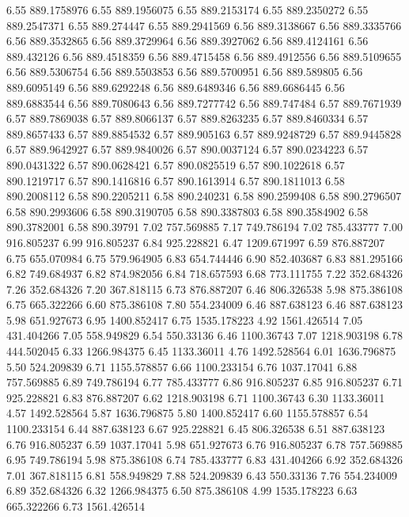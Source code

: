 6.55 	889.1758976
6.55 	889.1956075
6.55 	889.2153174
6.55 	889.2350272
6.55 	889.2547371
6.55 	889.274447
6.55 	889.2941569
6.56 	889.3138667
6.56 	889.3335766
6.56 	889.3532865
6.56 	889.3729964
6.56 	889.3927062
6.56 	889.4124161
6.56 	889.432126
6.56 	889.4518359
6.56 	889.4715458
6.56 	889.4912556
6.56 	889.5109655
6.56 	889.5306754
6.56 	889.5503853
6.56 	889.5700951
6.56 	889.589805
6.56 	889.6095149
6.56 	889.6292248
6.56 	889.6489346
6.56 	889.6686445
6.56 	889.6883544
6.56 	889.7080643
6.56 	889.7277742
6.56 	889.747484
6.57 	889.7671939
6.57 	889.7869038
6.57 	889.8066137
6.57 	889.8263235
6.57 	889.8460334
6.57 	889.8657433
6.57 	889.8854532
6.57 	889.905163
6.57 	889.9248729
6.57 	889.9445828
6.57 	889.9642927
6.57 	889.9840026
6.57 	890.0037124
6.57 	890.0234223
6.57 	890.0431322
6.57 	890.0628421
6.57 	890.0825519
6.57 	890.1022618
6.57 	890.1219717
6.57 	890.1416816
6.57 	890.1613914
6.57 	890.1811013
6.58 	890.2008112
6.58 	890.2205211
6.58 	890.240231
6.58 	890.2599408
6.58 	890.2796507
6.58 	890.2993606
6.58 	890.3190705
6.58 	890.3387803
6.58 	890.3584902
6.58 	890.3782001
6.58 	890.39791
7.02 	757.569885
7.17 	749.786194
7.02 	785.433777
7.00 	916.805237
6.99 	916.805237
6.84 	925.228821
6.47 	1209.671997
6.59 	876.887207
6.75 	655.070984
6.75 	579.964905
6.83 	654.744446
6.90 	852.403687
6.83 	881.295166
6.82 	749.684937
6.82 	874.982056
6.84 	718.657593
6.68 	773.111755
7.22 	352.684326
7.26 	352.684326
7.20 	367.818115
6.73 	876.887207
6.46 	806.326538
5.98 	875.386108
6.75 	665.322266
6.60 	875.386108
7.80 	554.234009
6.46 	887.638123
6.46 	887.638123
5.98 	651.927673
6.95 	1400.852417
6.75 	1535.178223
4.92 	1561.426514
7.05 	431.404266
7.05 	558.949829
6.54 	550.33136
6.46 	1100.36743
7.07 	1218.903198
6.78 	444.502045
6.33 	1266.984375
6.45 	1133.36011
4.76 	1492.528564
6.01 	1636.796875
5.50 	524.209839
6.71 	1155.578857
6.66 	1100.233154
6.76 	1037.17041
6.88 	757.569885
6.89 	749.786194
6.77 	785.433777
6.86 	916.805237
6.85 	916.805237
6.71 	925.228821
6.83 	876.887207
6.62 	1218.903198
6.71 	1100.36743
6.30 	1133.36011
4.57 	1492.528564
5.87 	1636.796875
5.80 	1400.852417
6.60 	1155.578857
6.54 	1100.233154
6.44 	887.638123
6.67 	925.228821
6.45 	806.326538
6.51 	887.638123
6.76 	916.805237
6.59 	1037.17041
5.98 	651.927673
6.76 	916.805237
6.78 	757.569885
6.95 	749.786194
5.98 	875.386108
6.74 	785.433777
6.83 	431.404266
6.92 	352.684326
7.01 	367.818115
6.81 	558.949829
7.88 	524.209839
6.43 	550.33136
7.76 	554.234009
6.89 	352.684326
6.32 	1266.984375
6.50 	875.386108
4.99 	1535.178223
6.63 	665.322266
6.73 	1561.426514

